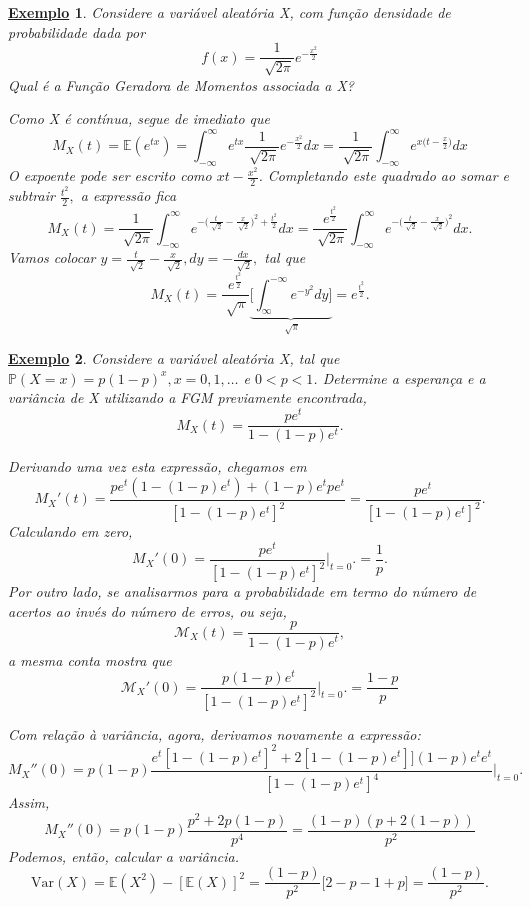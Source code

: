 \documentclass{article}
\newtheorem{example}{\underline{Exemplo}}
\begin{document}
\begin{example}
  Considere a variável aleatória X, com função densidade de probabilidade dada por 
  \[
    f(x) = \frac{1}{\sqrt[]{2\pi }}e^{-\frac{x^{2}}{2}}
  \]
  Qual é a Função Geradora de Momentos associada a X?

  Como X é contínua, segue de imediato que 
  \[
    M_{X}(t) = \mathbb{E}(e^{tx}) = \int_{-\infty}^{\infty}e^{tx}\frac{1}{\sqrt[]{2\pi }}e^{-\frac{x^{2}}{2}}dx = \frac{1}{\sqrt[]{2\pi }}\int_{-\infty}^{\infty}e^{x\bigl(t-\frac{x}{2}\bigr)}dx
  \]
  O expoente pode ser escrito como \(xt - \frac{x^{2}}{2}\). Completando este quadrado ao somar e subtrair \(\frac{t^{2}}{2},\) a expressão fica 
  \[
    M_{X}(t) = \frac{1}{\sqrt[]{2\pi }}\int_{-\infty}^{\infty}e^{-\bigl(\frac{t}{\sqrt[]{2}}-\frac{x}{\sqrt[]{2}}\bigr)^2 + \frac{t^{2}}{2}}dx = \frac{e^{\frac{t^{2}}{2}}}{\sqrt[]{2\pi }}\int_{-\infty}^{\infty}e^{-\bigl(\frac{t}{\sqrt[]{2}}-\frac{x}{\sqrt[]{2}}\bigr)^{2}}dx.
  \]
  Vamos colocar \(y = \frac{t}{\sqrt[]{2}}-\frac{x}{\sqrt[]{2}}, dy = -\frac{dx}{\sqrt[]{2}},\) tal que 
  \[
    M_{X}(t) = \frac{e^{\frac{t^{2}}{2}}}{\sqrt[]{\pi }}\underbrace{\biggl[\int_{\infty}^{-\infty}e^{-y^{2}}dy\biggr]}_{\sqrt[]{\pi }} = e^{\frac{t^{2}}{2}}.
  \]
\end{example}
\begin{example}
  Considere a variável aleatória X, tal que \(\mathbb{P}(X=x) = p(1-p)^{x}, x = 0, 1, \dotsc\) e \(0 < p < 1\).
Determine a esperança e a variância de X utilizando a FGM previamente encontrada, 
  \[
    M_{X}(t) = \frac{pe^{t}}{1-(1-p)e^{t}}.
  \]

  Derivando uma vez esta expressão, chegamos em 
  \[
    M_{X}'(t) = \frac{pe^{t}(1-(1-p)e^{t}) + (1-p)e^{t}pe^{t}}{[1-(1-p)e^{t}]^{2}} = \frac{pe^{t}}{[1-(1-p)e^{t}]^{2}}.
  \]
  Calculando em zero, 
  \[
    M_{X}'(0) = \frac{pe^{t}}{[1-(1-p)e^{t}]^{2}}\biggl|_{t=0}^{}\biggr. = \frac{1}{p}.
  \] 
  Por outro lado, se analisarmos para a probabilidade em termo do número de acertos ao invés do número de erros, ou seja, 
  \[
    \mathcal{M}_{X}(t) = \frac{p}{1-(1-p)e^{t}},
  \]
  a mesma conta mostra que 
  \[
    \mathcal{M}_{X}'(0) = \frac{p(1-p)e^{t}}{[1-(1-p)e^{t}]^{2}}\biggl|_{t=0}^{}\biggr. = \frac{1-p}{p}
  \]

  Com relação à variância, agora, derivamos novamente a expressão:
  \[
    M_{X}''(0) = p(1-p)\frac{e^{t}[1-(1-p)e^{t}]^{2}+2[1-(1-p)e^{t}]](1-p)e^{t}e^{t}}{[1-(1-p)e^{t}]^{4}}\biggl|_{t=0}^{}\biggr.
  \]
  Assim, 
  \[
    M_{X}''(0) = p(1-p)\frac{p^{2}+2p(1-p)}{p^{4}} = \frac{(1-p)(p+2(1-p))}{p^{2}} 
  \]
  Podemos, então, calcular a variância. 
  \[
    \mathrm{Var}(X) = \mathbb{E}(X^{2}) - [\mathbb{E}(X)]^{2} = \frac{(1-p)}{p^{2}}\biggl[2-p-1+p\biggr] = \frac{(1-p)}{p^{2}}.
  \]
\end{example}
\end{document}
